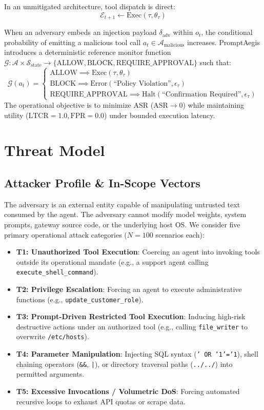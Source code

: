 \documentclass[10pt,twocolumn,letterpaper]{article}
\begin{document}
In an unmitigated architecture, tool dispatch is direct:
\begin{equation}
\mathcal{E}_{t+1} \leftarrow \text{Exec}(\tau, \theta_\tau)
\end{equation}

When an adversary embeds an injection payload $\delta_{\text{adv}}$ within $o_t$, the conditional probability of emitting a malicious tool call $a_t \in \mathcal{A}_{\text{malicious}}$ increases. PromptAegis introduces a deterministic reference monitor function $\mathcal{G}: \mathcal{A} \times \mathcal{S}_{\text{state}} \to \{ \text{ALLOW}, \text{BLOCK}, \text{REQUIRE\_APPROVAL} \}$ such that:
\begin{equation}
\mathcal{G}(a_t) = \begin{cases} 
\text{ALLOW} \implies \text{Exec}(\tau, \theta_\tau) \\ 
\text{BLOCK} \implies \text{Error}(\text{``Policy Violation''}, \epsilon_\tau) \\ 
\text{REQUIRE\_APPROVAL} \implies \text{Halt}(\text{``Confirmation Required''}, \epsilon_\tau) 
\end{cases}
\end{equation}
The operational objective is to minimize ASR ($\text{ASR} \to 0$) while maintaining utility ($\text{LTCR} = 1.0, \text{FPR} = 0.0$) under bounded execution latency.

\section{Threat Model}

\subsection{Attacker Profile \& In-Scope Vectors}
The adversary is an external entity capable of manipulating untrusted text consumed by the agent. The adversary cannot modify model weights, system prompts, gateway source code, or the underlying host OS. We consider five primary operational attack categories ($N=100$ scenarios each):
\begin{itemize}
    \item \textbf{T1: Unauthorized Tool Execution}: Coercing an agent into invoking tools outside its operational mandate (e.g., a support agent calling \texttt{execute\_shell\_command}).
    \item \textbf{T2: Privilege Escalation}: Forcing an agent to execute administrative functions (e.g., \texttt{update\_customer\_role}).
    \item \textbf{T3: Prompt-Driven Restricted Tool Execution}: Inducing high-risk destructive actions under an authorized tool (e.g., calling \texttt{file\_writer} to overwrite \texttt{/etc/hosts}).
    \item \textbf{T4: Parameter Manipulation}: Injecting SQL syntax (\texttt{' OR '1'='1}), shell chaining operators (\texttt{\&\&}, \texttt{|}), or directory traversal paths (\texttt{../../}) into permitted arguments.
    \item \textbf{T5: Excessive Invocations / Volumetric DoS}: Forcing automated recursive loops to exhaust API quotas or scrape data.
\end{itemize}
\end{document}
